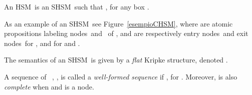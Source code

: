 \documentclass[letterpaper,twocolumn,10pt]{article}
\newtheorem{definition}{Definition}
\newcommand{\ignore}[1]{}
\newcommand{\VHSM}{SHSM}
\newcommand{\HSM}{HSM}
\newcommand{\nnode}{node} \newcommand{\nnodes}{nodes} \newcommand{\expand} {\mathit{expn}}
\newcommand{\word}{well-formed sequence}
\begin{document}
An \HSM\ is an \VHSM\ such that  ,
for any box .


As an example of an \VHSM\  see
Figure~\ref{esempioCHSM}, where  are atomic
propositions labeling \nnodes\ and \boxes\ of ,  and 
are respectively entry \nnodes\ and exit \nnodes\ for , and
 for  and .




\ignore{
\begin{definition}\label{restricted}
A restricted \VHSM\  is an \VHSM\
where for all vertices 
such that  is an ancestor of  in  it holds:\\
\centerline{}
\end{definition}

Such a restriction is quite natural and still allows us to succinctly represent
interesting systems. Note that
the \VHSM\ of Figure~\ref{esempioCHSM} is also restricted.
}



The semantics of an \VHSM\ 
is given by a {\em flat}  Kripke structure, denoted .

A sequence of \vertices\ , , is
called a {\em \word} if , for
.
Moreover,  is also {\em complete} when  and
 is a \nnode.
\end{document}
